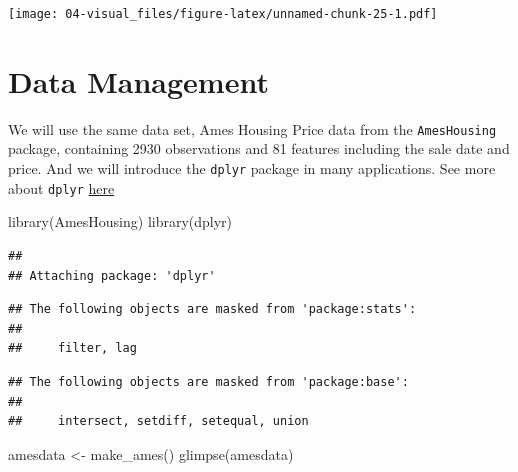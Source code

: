 \documentclass[
]{book}
\newenvironment{Shaded}{\begin{snugshade}}{\end{snugshade}}
\newcommand{\FunctionTok}[1]{\textcolor[rgb]{0.00,0.00,0.00}{#1}}
\newcommand{\NormalTok}[1]{#1}
\newcommand{\OtherTok}[1]{\textcolor[rgb]{0.56,0.35,0.01}{#1}}
\begin{document}
\texttt{[image: 04-visual\_files/figure-latex/unnamed-chunk-25-1.pdf]}

\hypertarget{data-management}{%
\chapter{Data Management}\label{data-management}}

We will use the same data set, Ames Housing Price data from the \texttt{AmesHousing} package, containing 2930 observations and 81 features including the sale date and price. And we will introduce the \texttt{dplyr} package in many applications. See more about \texttt{dplyr} \href{https://dplyr.tidyverse.org/articles/dplyr.html}{here}

\begin{Shaded}
\begin{Highlighting}[]
\FunctionTok{library}\NormalTok{(AmesHousing)}
\FunctionTok{library}\NormalTok{(dplyr)}
\end{Highlighting}
\end{Shaded}

\begin{verbatim}
## 
## Attaching package: 'dplyr'
\end{verbatim}

\begin{verbatim}
## The following objects are masked from 'package:stats':
## 
##     filter, lag
\end{verbatim}

\begin{verbatim}
## The following objects are masked from 'package:base':
## 
##     intersect, setdiff, setequal, union
\end{verbatim}

\begin{Shaded}
\begin{Highlighting}[]
\NormalTok{amesdata }\OtherTok{\textless{}{-}} \FunctionTok{make\_ames}\NormalTok{()}
\FunctionTok{glimpse}\NormalTok{(amesdata)}
\end{Highlighting}
\end{Shaded}
\end{document}
